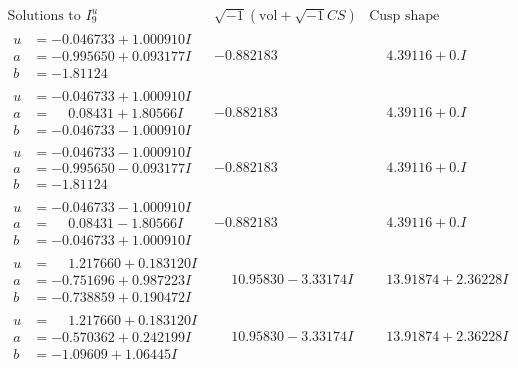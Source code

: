\documentclass[1p]{elsarticle_modified}
\theoremstyle{definition}
\newcommand{\I}{\sqrt{-1}}
\begin{document}
$$\begin{array}{c|c|c}  
\text{Solutions to }I^u_{9}& \I (\text{vol} + \sqrt{-1}CS) & \text{Cusp shape}\\
 \hline 
\begin{aligned}
u &= -0.046733 + 1.000910 I \\
a &= -0.995650 + 0.093177 I \\
b &= -1.81124\phantom{ +0.000000I}\end{aligned}
 & -0.882183\phantom{ +0.000000I} & \phantom{-}4.39116 + 0. I\phantom{ +0.000000I} \\ \hline\begin{aligned}
u &= -0.046733 + 1.000910 I \\
a &= \phantom{-}0.08431 + 1.80566 I \\
b &= -0.046733 - 1.000910 I\end{aligned}
 & -0.882183\phantom{ +0.000000I} & \phantom{-}4.39116 + 0. I\phantom{ +0.000000I} \\ \hline\begin{aligned}
u &= -0.046733 - 1.000910 I \\
a &= -0.995650 - 0.093177 I \\
b &= -1.81124\phantom{ +0.000000I}\end{aligned}
 & -0.882183\phantom{ +0.000000I} & \phantom{-}4.39116 + 0. I\phantom{ +0.000000I} \\ \hline\begin{aligned}
u &= -0.046733 - 1.000910 I \\
a &= \phantom{-}0.08431 - 1.80566 I \\
b &= -0.046733 + 1.000910 I\end{aligned}
 & -0.882183\phantom{ +0.000000I} & \phantom{-}4.39116 + 0. I\phantom{ +0.000000I} \\ \hline\begin{aligned}
u &= \phantom{-}1.217660 + 0.183120 I \\
a &= -0.751696 + 0.987223 I \\
b &= -0.738859 + 0.190472 I\end{aligned}
 & \phantom{-}10.95830 - 3.33174 I & \phantom{-}13.91874 + 2.36228 I \\ \hline\begin{aligned}
u &= \phantom{-}1.217660 + 0.183120 I \\
a &= -0.570362 + 0.242199 I \\
b &= -1.09609 + 1.06445 I\end{aligned}
 & \phantom{-}10.95830 - 3.33174 I & \phantom{-}13.91874 + 2.36228 I \\ \hline\begin{aligned}

\end{aligned}
\end{array}$$
\end{document}
